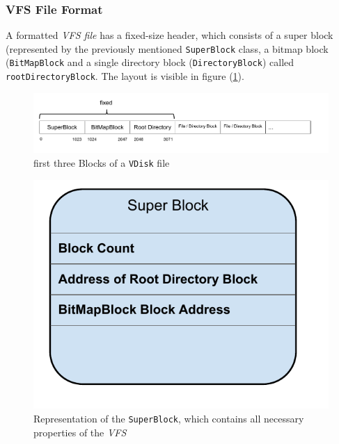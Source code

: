 \documentclass[a4paper,12pt]{article}
\begin{document}
\subsubsection{VFS File Format}
A formatted \emph{VFS file} has a fixed-size header, which consists of a super block (represented by the previously mentioned \texttt{SuperBlock} class, a bitmap block (\texttt{BitMapBlock} and a single directory block (\texttt{DirectoryBlock}) called \texttt{rootDirectoryBlock}. The layout is visible in figure (\ref{vdiskheader}).

\begin{figure}[!h]
\begin{center}
\includegraphics[scale=0.6]{images/VDiskHeader.pdf}
\caption{first three Blocks of a \texttt{VDisk} file}
\label{vdiskheader}
\end{center}
\end{figure}

\begin{figure}[!h]
\begin{center}
\includegraphics[scale=0.5]{images/SuperBlock.pdf}
\caption{Representation of the \texttt{SuperBlock}, which contains all necessary properties of the \emph{VFS}}
\label{superblock}
\end{center}
\end{figure}
\end{document}

